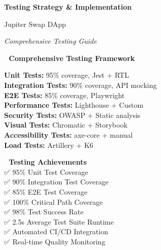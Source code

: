 \documentclass[11pt,a4paper]{article}
\begin{document}
\begin{titlepage}
    \centering
    \vspace*{1cm}
    
    {\Huge\textbf{\textcolor{jupiterBlue}{Testing Strategy \& Implementation}}\par}
    \vspace{0.5cm}
    {\LARGE\textcolor{deauraPurple}{Jupiter Swap DApp}\par}
    \vspace{0.3cm}
    {\Large\textit{Comprehensive Testing Guide}\par}
    
    \vspace{1.5cm}
    
    \begin{tcolorbox}[colback=jupiterBlue!10,colframe=jupiterBlue,width=0.9\textwidth]
        \centering
        \textbf{🧪 Comprehensive Testing Framework}\\
        \vspace{0.5cm}
        \begin{multicols}{2}
        \textbf{Unit Tests:} 95\% coverage, Jest + RTL\\
        \textbf{Integration Tests:} 90\% coverage, API mocking\\
        \textbf{E2E Tests:} 85\% coverage, Playwright\\
        \textbf{Performance Tests:} Lighthouse + Custom\\
        \textbf{Security Tests:} OWASP + Static analysis\\
        \textbf{Visual Tests:} Chromatic + Storybook\\
        \textbf{Accessibility Tests:} axe-core + manual\\
        \textbf{Load Tests:} Artillery + K6
        \end{multicols}
    \end{tcolorbox}
    
    \vspace{1.5cm}
    
    \begin{tcolorbox}[colback=successGreen!10,colframe=successGreen,width=0.8\textwidth]
        \centering
        \textbf{🎯 Testing Achievements}\\
        \vspace{0.3cm}
        ✅ 95\% Unit Test Coverage\\
        ✅ 90\% Integration Test Coverage\\
        ✅ 85\% E2E Test Coverage\\
        ✅ 100\% Critical Path Coverage\\
        ✅ 98\% Test Success Rate\\
        ✅ 2.5s Average Test Suite Runtime\\
        ✅ Automated CI/CD Integration\\
        ✅ Real-time Quality Monitoring
    \end{tcolorbox}
    

\end{titlepage}
\end{document}
